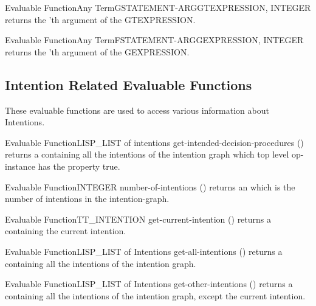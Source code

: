 \begin{typeefa}{Evaluable Function}{Any Term}{GSTATEMENT-ARG}{GTEXPRESSION, INTEGER }
returns the 'th argument of the GTEXPRESSION.
\end{typeefa}

\begin{typeefa}{Evaluable Function}{Any Term}{FSTATEMENT-ARG}{GEXPRESSION, INTEGER
}
returns the 'th argument of the GEXPRESSION.
\end{typeefa}

\subsection{Intention Related Evaluable Functions}

These evaluable functions are used to access various information about Intentions.

\begin{typeefa}{Evaluable Function}{LISP\_LIST of intentions}
{get-intended-decision-procedures} {()} 
returns a  containing all the intentions of the intention graph
which top level op-instance has the property  true.
\end{typeefa}

\begin{typeefa}{Evaluable Function}{INTEGER} {number-of-intentions} {()}
returns an  which is the number of intentions in the
intention-graph.
\end{typeefa}

\begin{typeefa}{Evaluable Function}{TT\_INTENTION} {get-current-intention} {()}
returns a  containing the current intention.
\end{typeefa}

\begin{typeefa}{Evaluable Function}{LISP\_LIST of Intentions} {get-all-intentions} {()}
returns a  containing all the intentions of the intention graph.
\end{typeefa}

\begin{typeefa}{Evaluable Function}{LISP\_LIST of Intentions} {get-other-intentions} {()}
returns a  containing all the intentions of the intention graph,
except the current intention.
\end{typeefa}


